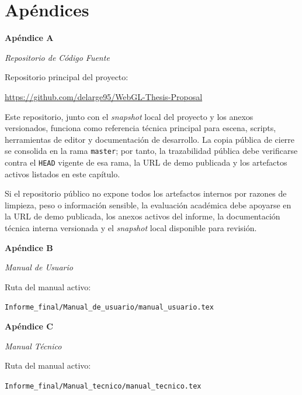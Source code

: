 
\section{Apéndices}

\label{apendice:A}
{\noindent\textbf{Apéndice A}\par
\noindent\textit{Repositorio de Código Fuente}\par}

Repositorio principal del proyecto:
\begin{center}
\url{https://github.com/delarge95/WebGL-Thesis-Proposal}
\end{center}

Este repositorio, junto con el \textit{snapshot} local del proyecto y los anexos versionados, funciona como referencia técnica principal para escena, scripts, herramientas de editor y documentación de desarrollo. La copia pública de cierre se consolida en la rama \texttt{master}; por tanto, la trazabilidad pública debe verificarse contra el \texttt{HEAD} vigente de esa rama, la URL de demo publicada y los artefactos activos listados en este capítulo.

Si el repositorio público no expone todos los artefactos internos por razones de limpieza, peso o información sensible, la evaluación académica debe apoyarse en la URL de demo publicada, los anexos activos del informe, la documentación técnica interna versionada y el \textit{snapshot} local disponible para revisión.

\clearpage
{}
\label{apendice:B}
{\noindent\textbf{Apéndice B}\par
\noindent\textit{Manual de Usuario}\par}

Ruta del manual activo:
\begin{center}
\texttt{Informe\_final/Manual\_de\_usuario/manual\_usuario.tex}
\end{center}

\clearpage
{}
\label{apendice:C}
{\noindent\textbf{Apéndice C}\par
\noindent\textit{Manual Técnico}\par}

Ruta del manual activo:
\begin{center}
\texttt{Informe\_final/Manual\_tecnico/manual\_tecnico.tex}
\end{center}

